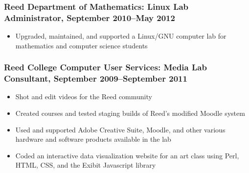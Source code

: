 \documentclass[letterpaper]{article}
\begin{document}
\subsubsection*{Reed Department of Mathematics: \textbf{Linux Lab Administrator}, September 2010--May 2012}
	\begin{itemize}
	   \item Upgraded, maintained, and supported a Linux/GNU computer lab for mathematics and computer science students
	\end{itemize}
\subsubsection*{Reed College Computer User Services: \textbf{Media Lab Consultant}, September 2009--September 2011}
	\begin{itemize}
    	\item Shot and edit videos for the Reed community
    	\item Created courses and tested staging builds of Reed's modified Moodle system 
    	\item Used and supported Adobe Creative Suite, Moodle, and other various hardware and software products available in the lab
    	\item Coded an interactive data visualization website for an art class using Perl, HTML, CSS, and the Exibit Javascript library
    \end{itemize}






\end{document}
